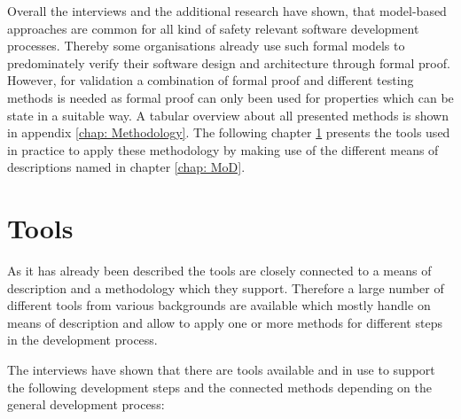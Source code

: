 \documentclass{./template/openetcs_report}
\begin{document}
Overall the interviews and the additional research have shown, that model-based approaches are common for all kind of safety relevant software development processes. Thereby some organisations already use such formal models to predominately verify their software design and architecture through formal proof. However, for validation a combination of formal proof and different testing methods is needed as formal proof can only been used for properties which can be state in a suitable way. A tabular overview about all presented methods is shown in appendix \ref{chap: Methodology}. The following chapter \ref{chap: tools} presents the tools used in practice to apply these methodology by making use of the different means of descriptions named in chapter \ref{chap: MoD}.


\chapter{Tools}

\label{chap: tools}

As it has already been described the tools are closely connected to a means of description  and a methodology which they support. Therefore a large number of different tools from various backgrounds are available which mostly handle on means of description and allow to apply one or more methods for different steps in the development process.

The interviews have shown that there are tools available and in use to support the following development steps and the connected methods depending on the general development process:
\end{document}
